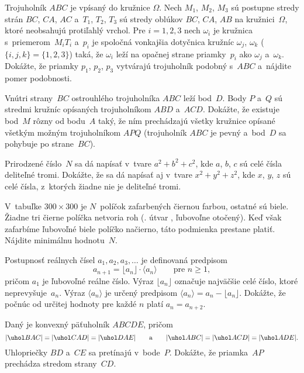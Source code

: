 {%
Trojuholník $ABC$ je vpísaný do kružnice $\Omega$. Nech $M_1$, $M_2$, $M_3$ sú postupne
stredy strán $BC$, $CA$, $AC$ a~$T_1$, $T_2$, $T_3$ sú stredy oblúkov $BC$, $CA$, $AB$
na kružnici~$\Omega$, ktoré neobsahujú protiľahlý vrchol. Pre $i=1,2,3$ nech
$\omega_i$ je kružnica s~priemerom~$M_iT_i$ a~$p_i$ je spoločná vonkajšia dotyčnica
kružníc $\omega_j$, $\omega_k$ ($\{i,j,k\}=\{1,2,3\}$) taká, že $\omega_i$ leží
na opačnej strane priamky~$p_i$ ako $\omega_j$ a~$\omega_k$. Dokážte, že priamky
$p_1$, $p_2$, $p_3$ vytvárajú trojuholník podobný s~$ABC$ a~nájdite pomer podobnosti.
}

{%
Vnútri strany~$BC$ ostrouhlého trojuholníka $ABC$ leží bod~$D$. Body $P$ a~$Q$ sú stredmi kružníc opísaných trojuholníkom $ABD$ a~$ACD$. Dokážte, že existuje bod~$M$ rôzny od bodu~$A$ taký, že ním prechádzajú všetky kružnice opísané všetkým možným trojuholníkom $APQ$ (trojuholník $ABC$ je pevný a~bod~$D$ sa pohybuje po strane~$BC$).}

{%
Prirodzené číslo~$N$ sa dá napísať v~tvare $a^2+b^2+c^2$, kde $a$, $b$, $c$ sú celé čísla deliteľné tromi. Dokážte, že sa dá napísať aj v~tvare $x^2+y^2+z^2$, kde $x$, $y$, $z$ sú celé čísla, z~ktorých žiadne nie je deliteľné tromi.}

{%
V~tabuľke $300\times 300$ je $N$~políčok zafarbených čiernou farbou, ostatné sú biele. Žiadne tri čierne políčka netvoria roh (\tj. útvar , ľubovoľne otočený). Keď však zafarbíme ľubovoľné biele políčko načierno, táto podmienka prestane platiť. Nájdite minimálnu hodnotu~$N$.}

{%
Postupnosť reálnych čísel $a_1,a_2,a_3,\dots$ je definovaná predpisom
$$
a_{n+1}=\lfloor a_n\rfloor \cdot \langle a_n\rangle \qquad\text{pre $n\ge1$},
$$
pričom $a_1$ je ľubovoľné reálne číslo. Výraz $\lfloor a_n\rfloor$ označuje najväčšie celé číslo, ktoré neprevyšuje~$a_n$. Výraz $\langle a_n\rangle$ je určený predpisom $\langle a_n\rangle=a_n-\lfloor a_n\rfloor$. Dokážte, že počnúc od určitej hodnoty pre každé $n$ platí $a_n=a_{n+2}$.
}

{%
Daný je konvexný päťuholník $ABCDE$, pričom
$$
|\uhol BAC|=|\uhol CAD|=|\uhol DAE|\qquad\text{a}\qquad |\uhol ABC|=|\uhol ACD|=|\uhol ADE|.
$$
Uhlopriečky $BD$ a~$CE$ sa pretínajú v~bode~$P$. Dokážte, že priamka~$AP$ prechádza stredom strany~$CD$.
}

